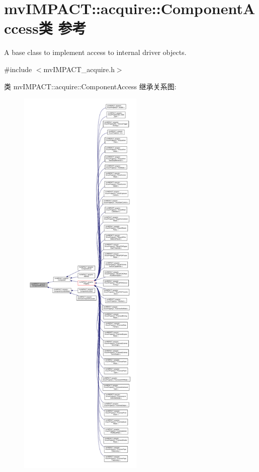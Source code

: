 \hypertarget{classmv_i_m_p_a_c_t_1_1acquire_1_1_component_access}{\section{mv\+I\+M\+P\+A\+C\+T\+:\+:acquire\+:\+:Component\+Access类 参考}
\label{classmv_i_m_p_a_c_t_1_1acquire_1_1_component_access}
}


A base class to implement access to internal driver objects.  




{\ttfamily \#include $<$mv\+I\+M\+P\+A\+C\+T\+\_\+acquire.\+h$>$}



类 mv\+I\+M\+P\+A\+C\+T\+:\+:acquire\+:\+:Component\+Access 继承关系图\+:
\nopagebreak
\begin{figure}[H]
\begin{center}
\leavevmode
\includegraphics[height=550pt]{classmv_i_m_p_a_c_t_1_1acquire_1_1_component_access__inherit__graph}
\end{center}
\end{figure}
